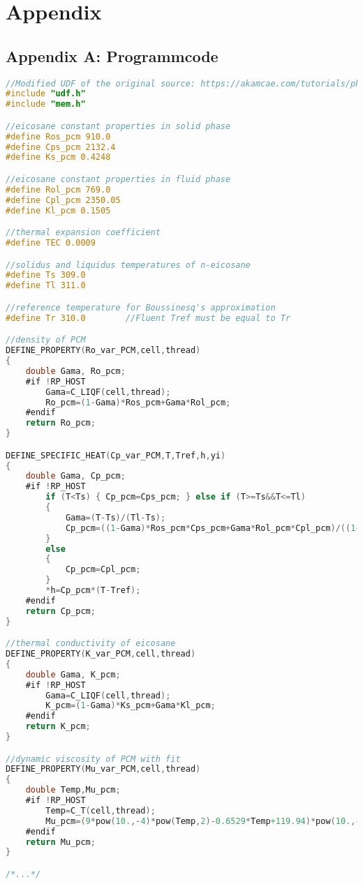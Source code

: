 \chapter*{Appendix}
\label{chapter:Appendix}
\pagestyle{Appendix}

\section*{Appendix A: Programmcode}\label{Anh:programmcode}

\begin{lstlisting}[language=C, caption={\ac{pcm} \ac{udf} eicosane.c ohne Boussinesq-Approximation}, label={lst:udf_rest}]
//Modified UDF of the original source: https://akamcae.com/tutorials/phase-change-material-simulation-in-ansys-fluent/
#include "udf.h"
#include "mem.h"

//eicosane constant properties in solid phase
#define Ros_pcm 910.0
#define Cps_pcm 2132.4
#define Ks_pcm 0.4248

//eicosane constant properties in fluid phase
#define Rol_pcm 769.0
#define Cpl_pcm 2350.05
#define Kl_pcm 0.1505

//thermal expansion coefficient
#define TEC 0.0009

//solidus and liquidus temperatures of n-eicosane
#define Ts 309.0
#define Tl 311.0

//reference temperature for Boussinesq's approximation
#define Tr 310.0		//Fluent Tref must be equal to Tr

//density of PCM
DEFINE_PROPERTY(Ro_var_PCM,cell,thread)
{
	double Gama, Ro_pcm;
	#if !RP_HOST
		Gama=C_LIQF(cell,thread);
		Ro_pcm=(1-Gama)*Ros_pcm+Gama*Rol_pcm;
	#endif
	return Ro_pcm;
}

DEFINE_SPECIFIC_HEAT(Cp_var_PCM,T,Tref,h,yi)
{
	double Gama, Cp_pcm;
	#if !RP_HOST
		if (T<Ts) { Cp_pcm=Cps_pcm; } else if (T>=Ts&&T<=Tl)
		{
			Gama=(T-Ts)/(Tl-Ts);
			Cp_pcm=((1-Gama)*Ros_pcm*Cps_pcm+Gama*Rol_pcm*Cpl_pcm)/((1-Gama)*Ros_pcm+Gama*Rol_pcm);
		}
		else
		{
			Cp_pcm=Cpl_pcm;
		}
		*h=Cp_pcm*(T-Tref);
	#endif
	return Cp_pcm;
}

//thermal conductivity of eicosane
DEFINE_PROPERTY(K_var_PCM,cell,thread)
{
	double Gama, K_pcm;
	#if !RP_HOST
		Gama=C_LIQF(cell,thread);
		K_pcm=(1-Gama)*Ks_pcm+Gama*Kl_pcm;
	#endif
	return K_pcm;
}

//dynamic viscosity of PCM with fit
DEFINE_PROPERTY(Mu_var_PCM,cell,thread)
{
	double Temp,Mu_pcm;
	#if !RP_HOST
		Temp=C_T(cell,thread);
		Mu_pcm=(9*pow(10.,-4)*pow(Temp,2)-0.6529*Temp+119.94)*pow(10.,-3);
	#endif
	return Mu_pcm;
}

/*...*/
\end{lstlisting}

